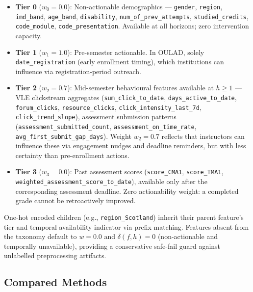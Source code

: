 \documentclass[a4paper,fleqn]{cas-sc}
\begin{document}
\begin{itemize}
    \item \textbf{Tier 0} ($w_0 = 0.0$): Non-actionable demographics —
          \texttt{gender}, \texttt{region}, \texttt{imd\_band}, \texttt{age\_band},
          \texttt{disability}, \texttt{num\_of\_prev\_attempts},
          \texttt{studied\_credits}, \texttt{code\_module}, \texttt{code\_presentation}.
          Available at all horizons; zero intervention capacity.

    \item \textbf{Tier 1} ($w_1 = 1.0$): Pre-semester actionable.
          In OULAD, solely \texttt{date\_registration} (early enrollment timing),
          which institutions can influence via registration-period outreach.

    \item \textbf{Tier 2} ($w_2 = 0.7$): Mid-semester behavioural features available
          at $h \geq 1$ — VLE clickstream aggregates
          (\texttt{sum\_click\_to\_date}, \texttt{days\_active\_to\_date},
          \texttt{forum\_clicks}, \texttt{resource\_clicks},
          \texttt{click\_intensity\_last\_7d}, \texttt{click\_trend\_slope}),
          assessment submission patterns
          (\texttt{assessment\_submitted\_count}, \texttt{assessment\_on\_time\_rate},
          \texttt{avg\_first\_submit\_gap\_days}).
          Weight $w_2 = 0.7$ reflects that instructors can influence these via
          engagement nudges and deadline reminders, but with less certainty than
          pre-enrollment actions.

    \item \textbf{Tier 3} ($w_3 = 0.0$): Past assessment scores
          (\texttt{score\_CMA1}, \texttt{score\_TMA1},
          \texttt{weighted\_assessment\_score\_to\_date}), available only after
          the corresponding assessment deadline.
          Zero actionability weight: a completed grade cannot be retroactively improved.
\end{itemize}

One-hot encoded children (e.g., \texttt{region\_Scotland}) inherit their parent
feature's tier and temporal availability indicator via prefix matching.
Features absent from the taxonomy default to $w = 0.0$ and $\delta(f,h) = 0$
(non-actionable and temporally unavailable), providing a conservative safe-fail
guard against unlabelled preprocessing artifacts.

\subsection{Compared Methods}
\end{document}
